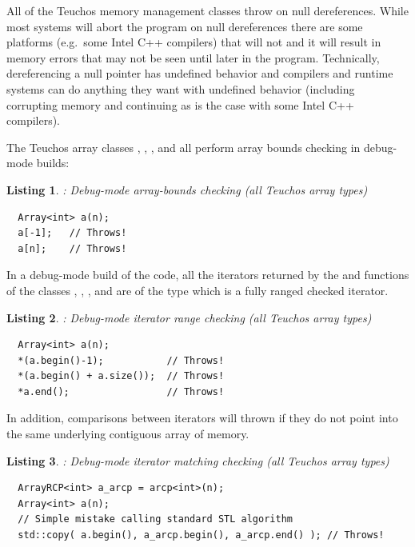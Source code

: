 \documentclass[pdf,ps2pdf,11pt]{SANDreport}
\newtheorem{listing}{Listing}
\begin{document}
All of the Teuchos memory management classes throw on null
dereferences.  While most systems will abort the program on null
dereferences there are some platforms (e.g.\ some Intel C++ compilers)
that will not and it will result in memory errors that may not be seen
until later in the program.  Technically, dereferencing a null pointer
has undefined behavior and compilers and runtime systems can do
anything they want with undefined behavior (including corrupting
memory and continuing as is the case with some Intel C++ compilers).

The Teuchos array classes {}, {},
{}, and {} all perform array bounds
checking in debug-mode builds:

\begin{listing}: Debug-mode array-bounds checking (all Teuchos array types) \\
\label{listing:array-bounds-checking}
{\small\begin{verbatim}
  Array<int> a(n);
  a[-1];   // Throws!
  a[n];    // Throws!
\end{verbatim}}
\end{listing}

In a debug-mode build of the code, all the iterators returned by the
{} and {} functions of the classes
{}, {}, {}, and
{} are of the type {} which is a fully
ranged checked iterator.


{}\begin{listing}: Debug-mode iterator range checking (all Teuchos
array types)
\label{listing:iterator-checking}
{\small\begin{verbatim}
  Array<int> a(n);
  *(a.begin()-1);           // Throws!
  *(a.begin() + a.size());  // Throws!
  *a.end();                 // Throws!
\end{verbatim}}
\end{listing}


In addition, comparisons between iterators will thrown if they do not
point into the same underlying contiguous array of memory.


{}\begin{listing}: Debug-mode iterator matching checking (all Teuchos
array types)
\label{listing:iterator-matching-checking}
{\small
\begin{verbatim}
  ArrayRCP<int> a_arcp = arcp<int>(n);
  Array<int> a(n);
  // Simple mistake calling standard STL algorithm
  std::copy( a.begin(), a_arcp.begin(), a_arcp.end() ); // Throws!
\end{verbatim}}
\end{listing}
\end{document}

